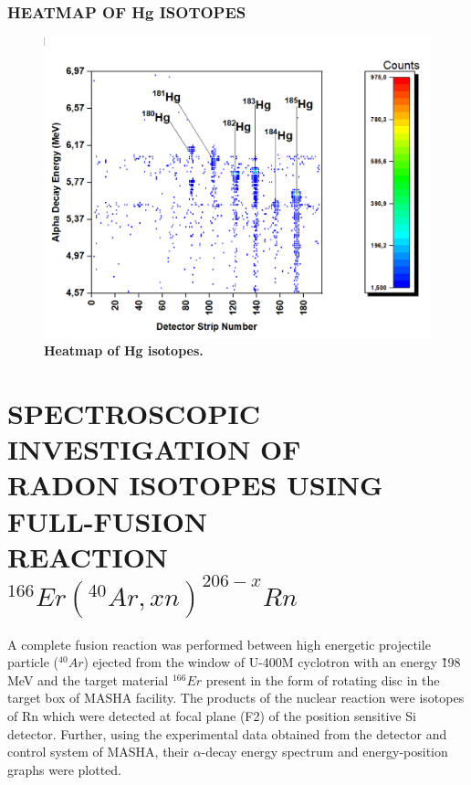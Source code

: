 \documentclass[12pt]{article}
\begin{document}
\subsubsection{HEATMAP OF Hg ISOTOPES}
\begin{figure}[h]
\centering
\includegraphics[scale=0.5]{Heatmap_Hg.png}
\caption{\textbf{Heatmap of Hg isotopes.}}
\label{Heatmap of Hg isotopes.}
\end{figure}

\section{SPECTROSCOPIC INVESTIGATION OF\\ RADON ISOTOPES USING FULL-FUSION\\ REACTION $^{166}Er(^{40}Ar,xn)^{206-x}Rn$}
A complete fusion reaction was performed between high energetic projectile particle ($^{40}Ar$) ejected from the window of U-400M cyclotron with an energy \~ 198 MeV and the target material $^{166}Er$ present in the form of rotating disc in the target box of MASHA facility. The products of the nuclear reaction were isotopes of Rn which were detected at focal plane (F2) of the position sensitive Si detector. Further, using the experimental data obtained from the detector and control system of MASHA, their $\alpha$-decay energy spectrum and energy-position graphs were plotted.   
\clearpage
\end{document}
